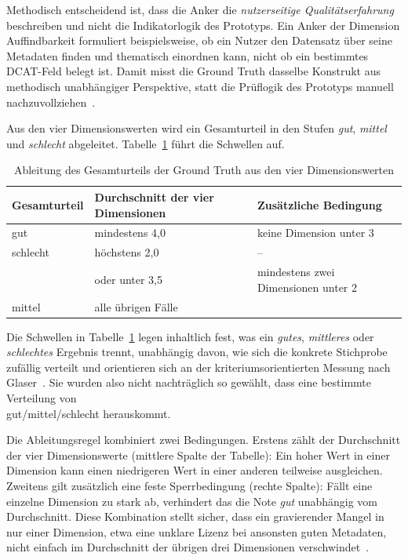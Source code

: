 Methodisch entscheidend ist, dass die Anker die \emph{nutzerseitige Qualitätserfahrung}
beschreiben und nicht die Indikatorlogik des Prototyps. Ein Anker der Dimension
Auffindbarkeit formuliert beispielsweise, ob ein Nutzer den Datensatz über seine
Metadaten finden und thematisch einordnen kann, nicht ob ein bestimmtes DCAT-Feld belegt
ist. Damit misst die Ground Truth dasselbe Konstrukt aus methodisch unabhängiger
Perspektive, statt die Prüflogik des Prototyps manuell
nachzuvollziehen~\cite{campbell1959convergent}.

Aus den vier Dimensionswerten wird ein Gesamturteil in den Stufen \emph{gut},
\emph{mittel} und \emph{schlecht} abgeleitet. Tabelle~\ref{tab:gt_gesamturteil} führt die
Schwellen auf.

\begin{table}[H]
\centering
\scriptsize
\renewcommand{\arraystretch}{1.2}
\begin{tabular}{p{} p{} p{}}
\hline
\textbf{Gesamturteil} & \textbf{Durchschnitt der vier Dimensionen} & \textbf{Zusätzliche Bedingung} \\
\hline
gut & mindestens 4,0 & keine Dimension unter 3 \\
\hline
schlecht & höchstens 2,0 & -- \\
 & oder unter 3,5 & mindestens zwei Dimensionen unter 2 \\
\hline
mittel & \multicolumn{2}{p{0.68\textwidth}}{alle übrigen Fälle} \\
\hline
\end{tabular}
\caption{Ableitung des Gesamturteils der Ground Truth aus den vier Dimensionswerten}
\label{tab:gt_gesamturteil}
\end{table}

Die Schwellen in Tabelle~\ref{tab:gt_gesamturteil} legen inhaltlich fest, was ein
\emph{gutes}, \emph{mittleres} oder \emph{schlechtes} Ergebnis trennt, unabhängig
davon, wie sich die konkrete Stichprobe zufällig verteilt und orientieren sich an der kriteriumsorientierten Messung nach Glaser~\cite{glaser1963}. Sie wurden
also nicht nachträglich so gewählt, dass eine bestimmte Verteilung von \\ gut/mittel/schlecht herauskommt.

Die Ableitungsregel kombiniert zwei Bedingungen. Erstens zählt der Durchschnitt der vier
Dimensionswerte (mittlere Spalte der Tabelle): Ein hoher Wert in einer Dimension kann
einen niedrigeren Wert in einer anderen teilweise ausgleichen. Zweitens gilt zusätzlich
eine feste Sperrbedingung (rechte Spalte): Fällt eine einzelne Dimension zu stark ab,
verhindert das die Note \emph{gut} unabhängig vom Durchschnitt. Diese Kombination stellt
sicher, dass ein gravierender Mangel in nur einer Dimension, etwa eine unklare Lizenz
bei ansonsten guten Metadaten, nicht einfach im Durchschnitt der übrigen drei
Dimensionen verschwindet~\cite{einhorn1971}.

